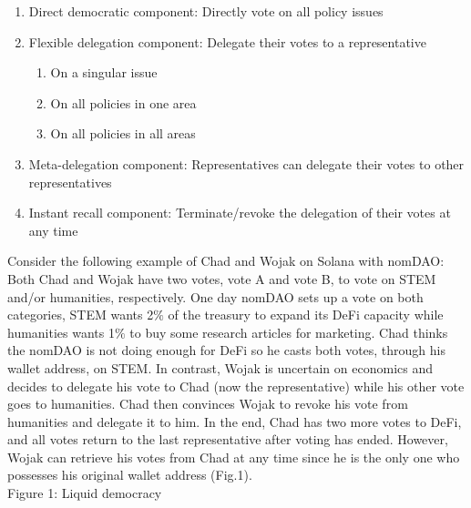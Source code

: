 \documentclass[12pt]{article}
\begin{document}
\begin{enumerate}

\item Direct democratic component: Directly vote on all policy issues

\item Flexible delegation component: Delegate their votes to a representative

\begin{enumerate}
    \item On a singular issue
    \item On all policies in one area
    \item On all policies in all areas
  \end{enumerate}

\item Meta-delegation component: Representatives can delegate their votes to other representatives

\item Instant recall component: Terminate/revoke the delegation of their votes at any time

\end{enumerate}

Consider the following example of Chad and Wojak on Solana with nomDAO: Both Chad and Wojak have two votes, vote A and vote B, to vote on STEM and/or humanities, respectively. One day nomDAO sets up a vote on both categories, STEM wants 2$\%$ of the treasury to expand its DeFi capacity while humanities wants 1$\%$ to buy some research articles for marketing. Chad thinks the nomDAO is not doing enough for DeFi so he casts both votes, through his wallet address, on STEM. In contrast, Wojak is uncertain on economics and decides to delegate his vote to Chad (now the representative) while his other vote goes to humanities. Chad then convinces Wojak to revoke his vote from humanities and delegate it to him. In the end, Chad has two more votes to DeFi, and all votes return to the last representative after voting has ended. However, Wojak can retrieve his votes from Chad at any time since he is the only one who possesses his original wallet address (Fig.1). \\

Figure 1: Liquid democracy\\
\end{document}
